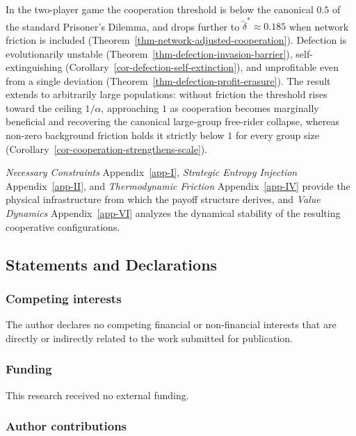 \documentclass[11pt]{article}
\theoremstyle{plain}
\theoremstyle{definition}
\theoremstyle{remark}
\let\origsubsection\subsection
\renewcommand{\subsection}{\needspace{7\baselineskip}\origsubsection}
\let\origsubsubsection\subsubsection
\renewcommand{\subsubsection}{\needspace{4\baselineskip}\origsubsubsection}
\begin{document}
In the two-player game the cooperation threshold is below the canonical
\(0.5\) of the standard Prisoner's Dilemma, and drops further to
\(\tilde{\delta}^* \approx 0.185\) when network friction is included
(Theorem~\ref{thm-network-adjusted-cooperation}). Defection is
evolutionarily unstable (Theorem~\ref{thm-defection-invasion-barrier}),
self-extinguishing (Corollary~\ref{cor-defection-self-extinction}), and
unprofitable even from a single deviation
(Theorem~\ref{thm-defection-profit-erasure}). The result extends to
arbitrarily large populations: without friction the threshold rises
toward the ceiling \(1/\alpha\), approaching \(1\) as cooperation
becomes marginally beneficial and recovering the canonical large-group
free-rider collapse, whereas non-zero background friction holds it
strictly below \(1\) for every group size
(Corollary~\ref{cor-cooperation-strengthens-scale}).

\emph{Necessary Constraints} Appendix~\ref{app-I}, \emph{Strategic
Entropy Injection} Appendix~\ref{app-II}, and \emph{Thermodynamic
Friction} Appendix~\ref{app-IV} provide the physical infrastructure from
which the payoff structure derives, and \emph{Value Dynamics}
Appendix~\ref{app-VI} analyzes the dynamical stability of the resulting
cooperative configurations.

\subsection*{Statements and
Declarations}\label{statements-and-declarations}

\subsubsection*{Competing interests}\label{competing-interests}

The author declares no competing financial or non-financial interests
that are directly or indirectly related to the work submitted for
publication.

\subsubsection*{Funding}\label{funding}

This research received no external funding.

\subsubsection*{Author contributions}\label{author-contributions}
\end{document}
